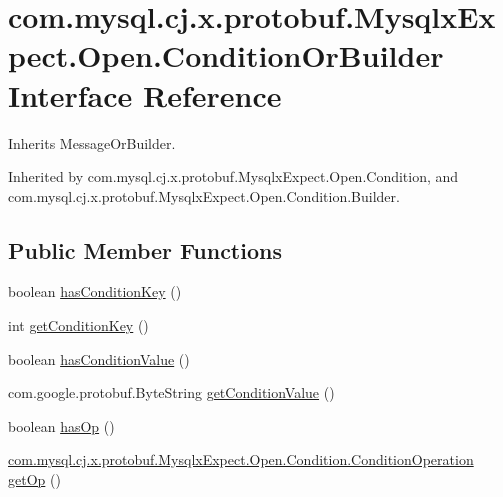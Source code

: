 \hypertarget{interfacecom_1_1mysql_1_1cj_1_1x_1_1protobuf_1_1_mysqlx_expect_1_1_open_1_1_condition_or_builder}{}\section{com.\+mysql.\+cj.\+x.\+protobuf.\+Mysqlx\+Expect.\+Open.\+Condition\+Or\+Builder Interface Reference}
\label{interfacecom_1_1mysql_1_1cj_1_1x_1_1protobuf_1_1_mysqlx_expect_1_1_open_1_1_condition_or_builder}


Inherits Message\+Or\+Builder.



Inherited by com.\+mysql.\+cj.\+x.\+protobuf.\+Mysqlx\+Expect.\+Open.\+Condition, and com.\+mysql.\+cj.\+x.\+protobuf.\+Mysqlx\+Expect.\+Open.\+Condition.\+Builder.

\subsection*{Public Member Functions}
\begin{DoxyCompactItemize}
\item 
boolean \mbox{\hyperlink{interfacecom_1_1mysql_1_1cj_1_1x_1_1protobuf_1_1_mysqlx_expect_1_1_open_1_1_condition_or_builder_a4864beeb423d33ca4e64e7580c6a9002}{has\+Condition\+Key}} ()
\item 
int \mbox{\hyperlink{interfacecom_1_1mysql_1_1cj_1_1x_1_1protobuf_1_1_mysqlx_expect_1_1_open_1_1_condition_or_builder_a69848d48534da258d7459b24f9341fb0}{get\+Condition\+Key}} ()
\item 
boolean \mbox{\hyperlink{interfacecom_1_1mysql_1_1cj_1_1x_1_1protobuf_1_1_mysqlx_expect_1_1_open_1_1_condition_or_builder_ab7ab8247b236c35284189b2a68a8eff9}{has\+Condition\+Value}} ()
\item 
com.\+google.\+protobuf.\+Byte\+String \mbox{\hyperlink{interfacecom_1_1mysql_1_1cj_1_1x_1_1protobuf_1_1_mysqlx_expect_1_1_open_1_1_condition_or_builder_a4695010d3caebf1495e94fbae98bb165}{get\+Condition\+Value}} ()
\item 
boolean \mbox{\hyperlink{interfacecom_1_1mysql_1_1cj_1_1x_1_1protobuf_1_1_mysqlx_expect_1_1_open_1_1_condition_or_builder_a26f9836ef55128fb65b3411cbd2a2c72}{has\+Op}} ()
\item 
\mbox{\hyperlink{enumcom_1_1mysql_1_1cj_1_1x_1_1protobuf_1_1_mysqlx_expect_1_1_open_1_1_condition_1_1_condition_operation}{com.\+mysql.\+cj.\+x.\+protobuf.\+Mysqlx\+Expect.\+Open.\+Condition.\+Condition\+Operation}} \mbox{\hyperlink{interfacecom_1_1mysql_1_1cj_1_1x_1_1protobuf_1_1_mysqlx_expect_1_1_open_1_1_condition_or_builder_a11f9187043d19158402b6062526d6790}{get\+Op}} ()
\end{DoxyCompactItemize}


